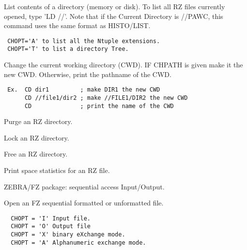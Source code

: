 \BEGARG
{}
\ENDARG
\BEGTEXT
List contents of a directory (memory or disk).
To list all RZ files currently opened, type 'LD //'.
Note that if the Current Directory is //PAWC, this command
uses the same format as HISTO/LIST.
\begin{verbatim}
 CHOPT='A' to list all the Ntuple extensions.
 CHOPT='T' to list a directory Tree.
\end{verbatim}
\ENDTEXT

\BEGARG
{}
\ENDARG
\BEGTEXT
Change the current working directory (CWD).
IF CHPATH is given make it the new CWD.
Otherwise, print the pathname of the CWD.
\begin{verbatim}
 Ex.  CD dir1         ; make DIR1 the new CWD
      CD //file1/dir2 ; make //FILE1/DIR2 the new CWD
      CD              ; print the name of the CWD
\end{verbatim}
\ENDTEXT

\BEGARG
{}
\ENDARG
\BEGTEXT
Purge an RZ directory.
\ENDTEXT

\BEGARG
{}
\ENDARG
\BEGTEXT
Lock an RZ directory.
\ENDTEXT

\BEGARG
{}
\ENDARG
\BEGTEXT
Free an RZ directory.
\ENDTEXT

\BEGARG
{}
\ENDARG
\BEGTEXT
Print space statistics for an RZ file.
\ENDTEXT


\BEGTEXT
ZEBRA/FZ package: sequential access Input/Output.
\ENDTEXT

\BEGARG
{}
\ENDARG
\BEGTEXT
Open an FZ sequential formatted or unformatted file.
\begin{verbatim}
  CHOPT = 'I' Input file.
  CHOPT = 'O' Output file
  CHOPT = 'X' binary eXchange mode.
  CHOPT = 'A' Alphanumeric exchange mode.
\end{verbatim}
\ENDTEXT

